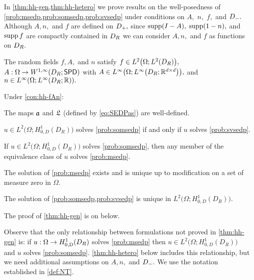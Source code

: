 In \cref{thm:hh-gen,thm:hh-hetero} we prove results on the well-posedness of \cref{prob:msedp,prob:somsedp,prob:svsedp} under conditions on $A,$ $n,$ $f,$ and $D_{-}.$ Although $A,n,$ and $f$ are defined on $D_{+},$ since $\operatorname{supp}(I-A),$ $\operatorname{supp}(1-n),$ and $\operatorname{supp} f$ are compactly contained in  $D_{R}$ we can consider $A,n,$ and $f$ as functions on $D_{R}.$

\label{con:hh-fAn}
The random fields $f, A,$ and $n$ satisfy $f \in \LtOLtDR,$  $A:\Omega \rightarrow \WoiDRspd$ with $A \in \LiOLiDRRRdtd,$ and $n \in \LiOLiDRRR.$
\econ

\label{thm:hh-gen}
Under \cref{con:hh-fAn}:
\bit
\item The maps $\mathfrak{a}$ and $\mathfrak{L}$ (defined by \eqref{eq:SEDPas}) are well-defined.
\item $u \in %
L^2\big(\Omega;H_{0,D}^1(D_R)\big)$
solves \cref{prob:somsedp} if and only if $u$ solves \cref{prob:svsedp}.
\item If $u \in
L^2\big(\Omega;H_{0,D}^1(D_R)\big)$
solves \cref{prob:somsedp}, then any member of the equivalence class of $u$ solves \cref{prob:msedp}.
\item The solution of \cref{prob:msedp} exists and is unique up to modification on a set of measure zero in $\Omega.$
\item The solution of \cref{prob:somsedp,prob:svsedp} is unique in $L^2\big(\Omega;H_{0,D}^1(D_R)\big)$. %
\eit
\enth

The proof of \cref{thm:hh-gen} is on  below.

Observe that the only relationship between formulations not proved in \cref{thm:hh-gen} is: if $u:\Omega\rightarrow \HozDDR$  solves \cref{prob:msedp} then $u \in 
L^2\big(\Omega;H_{0,D}^1(D_R)\big)$
and $u$ solves \cref{prob:somsedp}. \cref{thm:hh-hetero} below includes this relationship, but we need additional assumptions on $A,n,$ and $D_{-}.$ We use the notation established in \cref{def:NT}.


